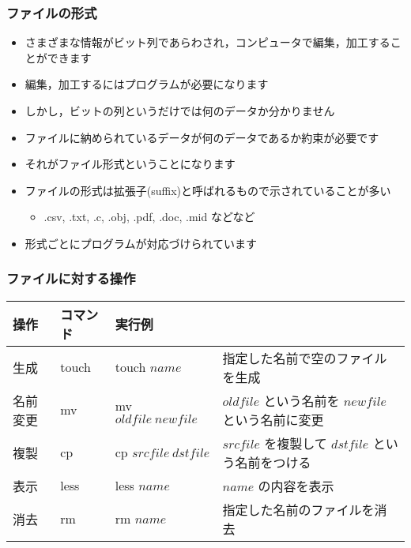 \begin{frame}
\frametitle{ファイルの形式}
  \begin{itemize}
\item さまざまな情報がビット列であらわされ，コンピュータで編集，加工することができます
\item 編集，加工するにはプログラムが必要になります
\item しかし，ビットの列というだけでは何のデータか分かりません
\item ファイルに納められているデータが何のデータであるか約束が必要です
\item それがファイル形式ということになります
\item ファイルの形式は拡張子(suffix)と呼ばれるもので示されていることが多い
    \begin{itemize}
\item .csv, .txt, .c, .obj, .pdf, .doc, .mid などなど
    \end{itemize}
\item 形式ごとにプログラムが対応づけられています
  \end{itemize}
\end{frame}
\begin{frame}
\frametitle{ファイルに対する操作}
\scriptsize
  \begin{tabular}{l|l|lp{4cm}}
操作 & コマンド & 実行例 & \\\hline
生成 & touch & touch $name$ & 指定した名前で空のファイルを生成\\
名前変更 & mv & mv $oldfile\ newfile$ & $oldfile$ という名前を $newfile$ という名前に変更\\
複製 & cp & cp $srcfile\ dstfile$ & $srcfile$ を複製して $dstfile$ という名前をつける\\
表示 & less & less $name$ & $name$ の内容を表示\\
消去 & rm & rm $name$ & 指定した名前のファイルを消去
  \end{tabular}
\end{frame}
